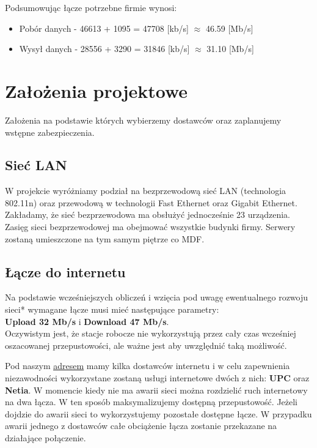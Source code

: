 \documentclass[a4paper,12pt]{extarticle}  %
\begin{document}
Podsumowując łącze potrzebne firmie wynosi:
\begin{itemize}
	\item Pobór danych - 46613 + 1095 = 47708 [kb/s] $\approx$ 46.59 [Mb/s]
	\item Wysył danych - 28556 + 3290 = 31846 [kb/s] $\approx$ 31.10 [Mb/s]
\end{itemize}

\section{Założenia projektowe}
Założenia na podstawie których wybierzemy dostawców oraz zaplanujemy wstępne zabezpieczenia.
\subsection{Sieć LAN}
W projekcie wyróżniamy podział na bezprzewodową sieć LAN 
(technologia 802.11n) oraz przewodową w technologii 
Fast Ethernet oraz Gigabit Ethernet. 
Zakładamy, że sieć bezprzewodowa ma obsłużyć jednocześnie 
23 urządzenia. Zasięg sieci bezprzewodowej ma obejmować 
wszystkie budynki firmy. 
Serwery zostaną umieszczone na tym samym piętrze co MDF.

\subsection{Łącze do internetu}

Na podstawie wcześniejszych obliczeń i wzięcia pod uwagę 
ewentualnego rozwoju sieci* wymagane łącze musi mieć 
następujące parametry:\\

\textbf{Upload 32 Mb/s} i \textbf{Download 47 Mb/s}.\\

Oczywistym jest, że stacje robocze nie wykorzystują przez 
cały czas wcześniej oszacowanej przepustowości, 
ale ważne jest aby uwzględnić taką możliwość.

Pod naszym \underline{\href{address}{adresem}} mamy kilka dostawców internetu i 
w celu zapewnienia niezawodności wykorzystane zostaną 
usługi internetowe dwóch z nich: 
\textbf{UPC} oraz \textbf{Netia}. 
W momencie kiedy nie ma awarii sieci można rozdzielić 
ruch internetowy na dwa łącza.  W ten sposób maksymalizujemy 
dostępną przepustowość. Jeżeli dojdzie do awarii sieci to 
wykorzystujemy pozostałe dostępne łącze. W przypadku awarii jednego z dostawców całe obciążenie łącza
zostanie przekazane na działające połączenie.
\end{document}
